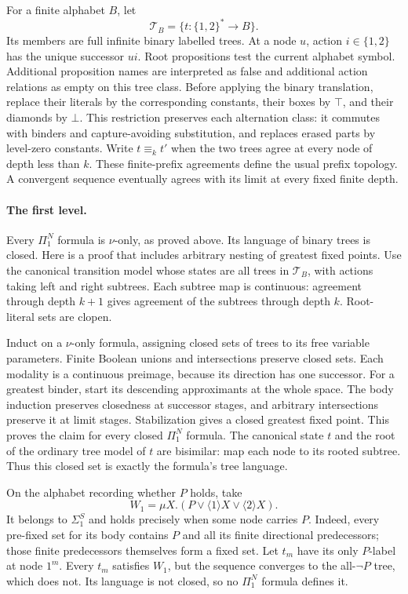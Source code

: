 For a finite alphabet \(B\),
let
\[
 \mathcal T_B=\{t:\{1,2\}^*\to B\}.
\]
Its members are full infinite
binary labelled trees.
At a node \(u\), action
\(i\in\{1,2\}\) has the
unique successor \(ui\).
Root propositions test the
current alphabet symbol.
Additional proposition names
are interpreted as false
and additional action relations
as empty on this tree class.
Before applying the binary
translation, replace their
literals by the corresponding
constants, their boxes by
\(\top\), and their diamonds
by \(\bot\).
This restriction preserves
each alternation class:
it commutes with binders
and capture-avoiding substitution,
and replaces erased parts
by level-zero constants.
Write \(t\equiv_k t'\)
when the two trees agree
at every node of depth
less than \(k\).
These finite-prefix agreements
define the usual prefix
topology. A convergent
sequence eventually agrees
with its limit at every
fixed finite depth.

\paragraph{The first level.}
Every \(\Pi_1^N\) formula
is \(\nu\)-only, as proved
above. Its language of
binary trees is closed.
Here is a proof that
includes arbitrary nesting
of greatest fixed points.
Use the canonical transition
model whose states are all
trees in \(\mathcal T_B\),
with actions taking left
and right subtrees.
Each subtree map is
continuous: agreement through
depth \(k+1\) gives agreement
of the subtrees through
depth \(k\).
Root-literal sets are clopen.

Induct on a \(\nu\)-only
formula, assigning closed
sets of trees to its
free variable parameters.
Finite Boolean unions and
intersections preserve closed
sets. Each modality is
a continuous preimage,
because its direction has
one successor.
For a greatest binder,
start its descending
approximants at the whole
space. The body induction
preserves closedness at
successor stages, and
arbitrary intersections
preserve it at limit
stages. Stabilization gives
a closed greatest fixed
point. This proves the
claim for every closed
\(\Pi_1^N\) formula.
The canonical state \(t\)
and the root of the
ordinary tree model of
\(t\) are bisimilar:
map each node to its
rooted subtree. Thus this
closed set is exactly
the formula's tree language.

On the alphabet recording
whether \(P\) holds, take
\[
 W_1=\mu X.
       (P\lor\langle1\rangle X\lor\langle2\rangle X).
\]
It belongs to \(\Sigma_1^S\)
and holds precisely when
some node carries \(P\).
Indeed, every pre-fixed set
for its body contains \(P\)
and all its finite directional
predecessors; those finite
predecessors themselves form
a fixed set.
Let \(t_m\) have its
only \(P\)-label at
node \(1^m\).
Every \(t_m\) satisfies
\(W_1\), but the sequence
converges to the all-\(\neg P\)
tree, which does not.
Its language is not
closed, so no \(\Pi_1^N\)
formula defines it.

